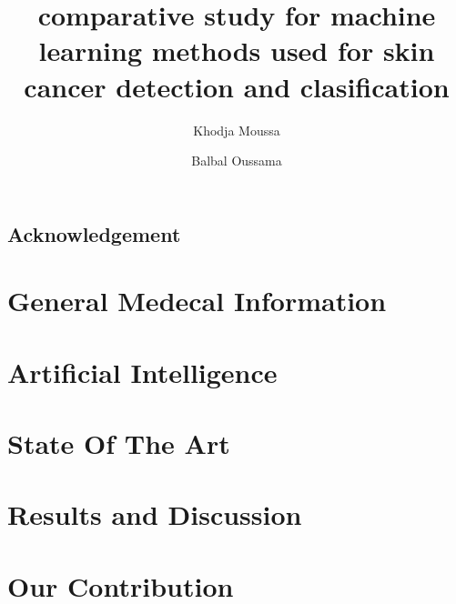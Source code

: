 \documentclass[12pt,a4paper]{report}
\title{comparative study for machine learning methods used for skin cancer detection and clasification}
\author{
	Khodja Moussa
	\and
	Balbal Oussama
}
\date{}
\begin{document}



\section*{Acknowledgement}
\newpage

\tableofcontents
\listoffigures
\listoftables
\newpage


\newpage


\chapter{General Medecal Information}





\chapter{Artificial Intelligence}


\chapter{State Of The Art}


\chapter{Results and Discussion}

\chapter{Our Contribution}





\end{document}
